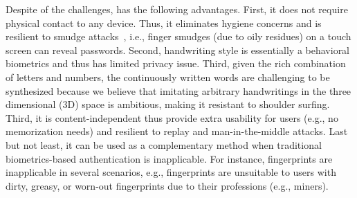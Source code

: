{Despite of the challenges, %
\CiT has the following advantages. First, it does not require physical contact to any device. Thus, it eliminates hygiene concerns and is resilient to smudge attacks~\cite{Aviv:woot10}, i.e., finger smudges (due to oily residues) on a touch screen can reveal passwords.  Second, handwriting style is essentially a behavioral biometrics and thus has limited privacy issue. Third, given the rich combination of letters and numbers, the continuously written words are challenging to be synthesized because we believe that imitating arbitrary handwritings in the three dimensional (3D) space is ambitious, making it resistant to shoulder surfing.}  
Third, it is content-independent thus provide extra usability for users (e.g., no memorization needs) and resilient to replay and man-in-the-middle attacks. 
Last but not least, it can be used as a complementary method when traditional biometrics-based authentication is inapplicable. For instance, fingerprints are inapplicable in several scenarios, e.g., fingerprints are unsuitable to users with dirty, greasy, or worn-out fingerprints due to their professions (e.g., miners). 




